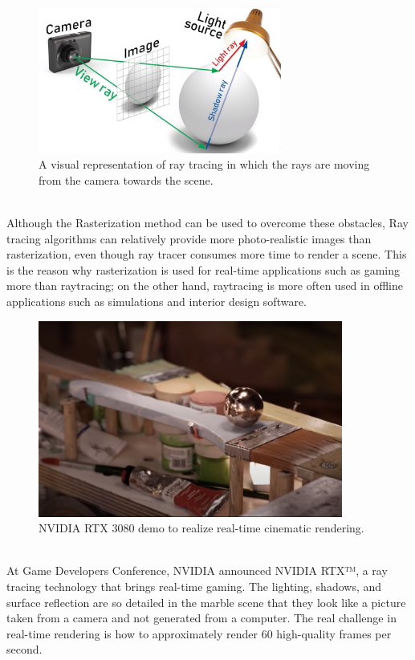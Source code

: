 \documentclass[11pt,a4paper]{article}
\begin{document}
\begin{figure}[h]	
     \centering
     \captionsetup{justification=centering,margin=2cm}
     \includegraphics[width=8cm]{images/raytracer_2.jpg}
     \caption{A visual representation of ray tracing in which the rays are moving from the camera towards the scene. \protect\cite{Kimathi2020}}
     \label{fig:raytracer}
\end{figure}

\noindent
\\
Although the Rasterization method can be used to overcome these obstacles, Ray tracing algorithms can relatively provide more photo-realistic images than rasterization, even though ray tracer consumes more time to render a scene. This is the reason why rasterization is used for real-time applications such as gaming more than raytracing; on the other hand, raytracing is more often used in offline applications such as simulations and interior design software.
\clearpage

\begin{figure}[h]	
     \centering
     \captionsetup{justification=centering,margin=2cm}
     \includegraphics[width=10cm]{images/marbel_brush.png}
     \caption{NVIDIA RTX 3080 demo to realize real-time cinematic rendering.
\protect\cite{Burke2018}}
     \label{fig:rtxdemo}
\end{figure}

\noindent
\\
At Game Developers Conference, NVIDIA announced NVIDIA RTX™, a ray tracing technology that brings real-time gaming. The lighting, shadows, and surface reflection are so detailed in the marble scene that they look like a picture taken from a camera and not generated from a computer. The real challenge in real-time rendering is how to approximately render 60 high-quality frames per second.
\end{document}
